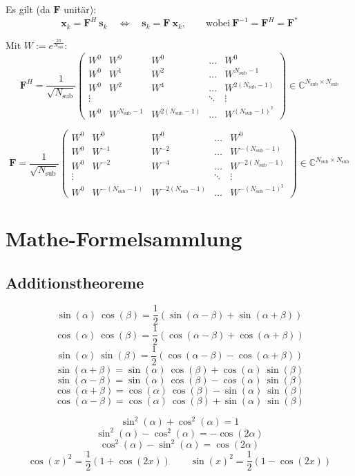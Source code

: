 \documentclass[a4paper, 11pt]{article}
\begin{document}
Es gilt (da $\mathbf F$ unitär):
\[
	\mathbf x_k = \mathbf F^H ~ \mathbf s_k \quad \Leftrightarrow \quad \mathbf s_k = \mathbf F ~ \mathbf x_k, \qquad \text{wobei} ~ \mathbf F^{-1} = \mathbf F^H = \mathbf F^*
\]

Mit $W := e^{\frac{2 \pi}{N_{\mathrm{sub}}}}$:
\[
	\mathbf F^H = \frac{1}{\sqrt{N_\mathrm{sub}}} \begin{pmatrix}
		W^0 & W^0 & W^0 & \ldots & W^0 \\
		W^0 & W^1 & W^2 & \ldots & W^{N_\mathrm{sub} - 1} \\
		W^0 & W^2 & W^4 & \ldots & W^{2 (N_\mathrm{sub} - 1)} \\
		\vdots & & & \ddots & \vdots \\
		W^0 & W^{N_\mathrm{sub} - 1} & W^{2(N_\mathrm{sub} - 1)} & \ldots & W^{(N_\mathrm{sub} - 1)^2}
	\end{pmatrix} \in \mathbb C^{N_\mathrm{sub} \times N_\mathrm{sub}}
\]

\[
	\mathbf F = \frac{1}{\sqrt{N_\mathrm{sub}}} \begin{pmatrix}
		W^0 & W^0 & W^0 & \ldots & W^0 \\
		W^0 & W^{-1} & W^{-2} & \ldots & W^{-(N_\mathrm{sub} - 1)} \\
		W^0 & W^{-2} & W^{-4} & \ldots & W^{-2 (N_\mathrm{sub} - 1)} \\
		\vdots & & & \ddots & \vdots \\
		W^0 & W^{-(N_\mathrm{sub} - 1)} & W^{-2(N_\mathrm{sub} - 1)} & \ldots & W^{-(N_\mathrm{sub} - 1)^2}
	\end{pmatrix} \in \mathbb C^{N_\mathrm{sub} \times N_\mathrm{sub}}
\]

\section*{Mathe-Formelsammlung}
\subsection*{Additionstheoreme}
\begin{multicols}{2}
\[ \sin(\alpha) ~ \cos(\beta) = \frac{1}{2} (\sin(\alpha - \beta) + \sin(\alpha + \beta)) \]
\[ \cos(\alpha) ~ \cos(\beta) = \frac{1}{2} (\cos(\alpha - \beta) + \cos(\alpha + \beta)) \]
\[ \sin(\alpha) ~ \sin(\beta) = \frac{1}{2} (\cos(\alpha - \beta) - \cos(\alpha + \beta)) \]
\vspace{0.5pt}
\[ \sin(\alpha + \beta) = \sin(\alpha) ~ \cos(\beta) + \cos(\alpha) ~ \sin(\beta) \]
\[ \sin(\alpha - \beta) = \sin(\alpha) ~ \cos(\beta) - \cos(\alpha) ~ \sin(\beta) \]
\[ \cos(\alpha + \beta) = \cos(\alpha) ~ \cos(\beta) - \sin(\alpha) ~ \sin(\beta) \]
\[ \cos(\alpha - \beta) = \cos(\alpha) ~ \cos(\beta) + \sin(\alpha) ~ \sin(\beta) \]
\end{multicols}
\vspace{0.5pt}
\[ \sin^2(\alpha) + \cos^2(\alpha) = 1 \]
\[ \sin^2(\alpha) - \cos^2(\alpha) = -\cos(2\alpha) \]
\[ \cos^2(\alpha) - \sin^2(\alpha) = \cos(2\alpha) \]
\[ \cos(x)^2 = \frac{1}{2} \left(1 + \cos(2x) \right) \qquad \sin(x)^2 = \frac{1}{2} \left(1 - \cos(2x) \right) \]
\end{document}
